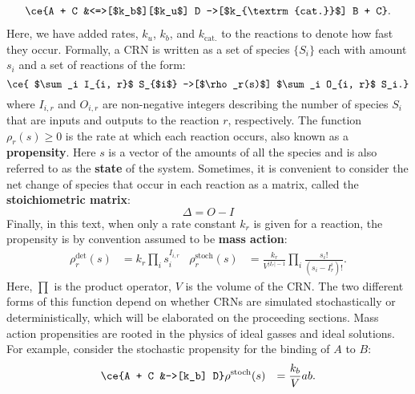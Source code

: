 \begin{align*}
    \ce{A + C &<=>[$k_b$][$k_u$] D ->[$k_{\textrm{cat.}}$] B + C}.
\end{align*}
Here, we have added rates, $k_u$, $k_b$, and $k_{\textrm{cat.}}$ to the reactions to denote how fast they occur.
%
Formally, a CRN is written as a set of species $\{S_i\}$ each with amount $s_i$ and a set of reactions of the form:
\begin{equation}
    \ce{ $\sum_i I_{i, r}$ S_{$i$} ->[$\rho_r(s)$] $\sum_i O_{i, r}$ S_i.}
\end{equation}
where $I_{i, r}$ and $O_{i, r}$ are non-negative integers describing the number of species $S_i$ that are inputs and outputs to the reaction $r$, respectively. The function $\rho_r(s) \geq 0$ is the rate at which each reaction occurs, also known as a \textbf{propensity}. Here $s$ is a vector of the amounts of all the species and is also referred to as the \textbf{state} of the system. Sometimes, it is convenient to consider the net change of species that occur in each reaction as a matrix, called the \textbf{stoichiometric matrix}:
\begin{equation}
    \Delta = O - I
\end{equation}
Finally, in this text, when only a rate constant $k_r$ is given for a reaction, the propensity is by convention assumed to be \textbf{mass action}:
\begin{align}
\rho^{\textrm{det}}_r(s) &= k_r \prod_i s_i^{I_{i, r}} &
      \rho^{\textrm{stoch}}_r(s) &=
        \frac{k_r}{V^{|I_r|-1}}
        \prod_i \frac{s_i!}{(s_i - I_r^i)!}.
\end{align}
Here, $\prod$ is the product operator, $V$ is the volume of the CRN. The two different forms of this function depend on whether CRNs are simulated stochastically or deterministically, which will be elaborated on the proceeding sections. Mass action propensities are rooted in the physics of ideal gasses and ideal solutions. For example, consider the stochastic propensity for the binding of $A$ to $B$:
\begin{align*}
    \ce{A + C &->[k_b] D} & \rho^{\textrm{stoch}}(s) &= \frac{k_b}{V}ab.
\end{align*}
